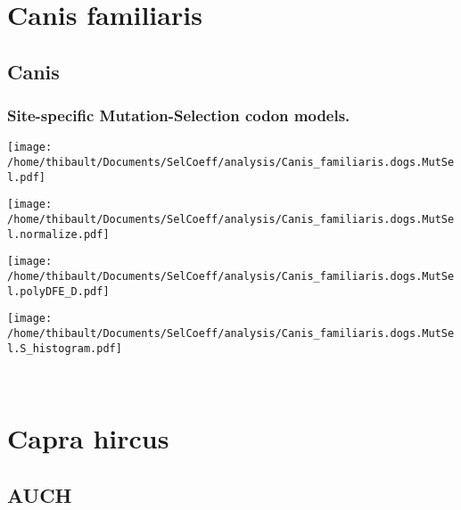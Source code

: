 \section{Canis familiaris} 
 
\subsection{Canis} 
 
\subsubsection*{Site-specific Mutation-Selection codon models.} 
\begin{minipage}{0.49\linewidth} 
\texttt{[image: /home/thibault/Documents/SelCoeff/analysis/Canis\_familiaris.dogs.MutSel.pdf]} 
\end{minipage}
\begin{minipage}{0.49\linewidth} 
\texttt{[image: /home/thibault/Documents/SelCoeff/analysis/Canis\_familiaris.dogs.MutSel.normalize.pdf]} 
\end{minipage}
\begin{minipage}{0.49\linewidth} 
\texttt{[image: /home/thibault/Documents/SelCoeff/analysis/Canis\_familiaris.dogs.MutSel.polyDFE\_D.pdf]} 
\end{minipage}
\begin{minipage}{0.49\linewidth} 
\texttt{[image: /home/thibault/Documents/SelCoeff/analysis/Canis\_familiaris.dogs.MutSel.S\_histogram.pdf]} 
\end{minipage}
\\ 
\section{Capra hircus} 
 
\subsection{AUCH} 
 
